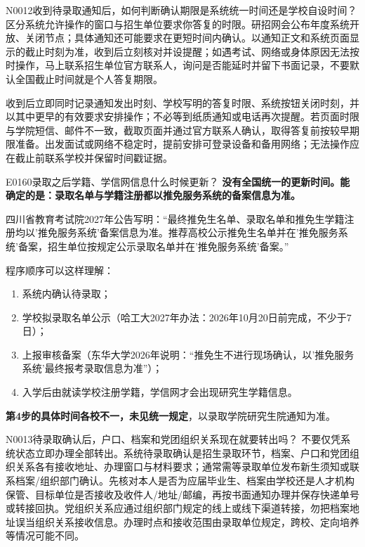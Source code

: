 \begin{qa}{N0012}{收到待录取通知后，如何判断确认期限是系统统一时间还是学校自设时间？}
区分系统允许操作的窗口与招生单位要求你答复的时限。研招网会公布年度系统开放、关闭节点；具体通知还可能要求在更短时间内确认。以通知正文和系统页面显示的截止时刻为准，收到后立刻核对并设提醒；如遇考试、网络或身体原因无法按时操作，马上联系招生单位官方联系人，询问是否能延时并留下书面记录，不要默认全国截止时间就是个人答复期限。

收到后立即同时记录通知发出时刻、学校写明的答复时限、系统按钮关闭时刻，并以其中更早的有效要求安排操作；不必等到纸质通知或电话再次提醒。若页面时限与学院短信、邮件不一致，截取页面并通过官方联系人确认，取得答复前按较早期限准备。出发面试或网络不稳定时，提前安排可登录设备和备用网络；无法操作应在截止前联系学校并保留时间戳证据。
\end{qa}
\begin{qa}{E0160}{录取之后学籍、学信网信息什么时候更新？}
\textbf{没有全国统一的更新时间。能确定的是：录取名单与学籍注册都以推免服务系统的备案信息为准。}

四川省教育考试院2027年公告写明：“最终推免生名单、录取名单和推免生学籍注册均以'推免服务系统'备案信息为准。推荐高校公示推免生名单并在'推免服务系统'备案，招生单位按规定公示录取名单并在'推免服务系统'备案。”

程序顺序可以这样理解：

\begin{enumerate}
  \item 系统内确认待录取；
  \item 学校拟录取名单公示（哈工大2027年办法：2026年10月20日前完成，不少于7日）；
  \item 上报审核备案（东华大学2026年说明：“推免生不进行现场确认，以'推免服务系统'最终报考录取信息为准”）；
  \item 入学后由就读学校注册学籍，学信网才会出现研究生学籍信息。
\end{enumerate}

\textbf{第4步的具体时间各校不一，未见统一规定}，以录取学院研究生院通知为准。
\end{qa}


\begin{qa}{N0013}{待录取确认后，户口、档案和党团组织关系现在就要转出吗？}
不要仅凭系统状态立即办理全部转出。系统待录取确认是招生录取环节，档案、户口和党团组织关系各有接收地址、办理窗口与材料要求；通常需等录取单位发布新生须知或联系档案/组织部门确认。先核对本人是否为应届毕业生、档案由学校还是人才机构保管、目标单位是否接收及收件人/地址/邮编，再按书面通知办理并保存快递单号或转接回执。党组织关系应通过组织部门规定的线上或线下渠道转接，勿把档案地址误当组织关系接收信息。办理时点和接收范围由录取单位规定，跨校、定向培养等情况可能不同。
\end{qa}

